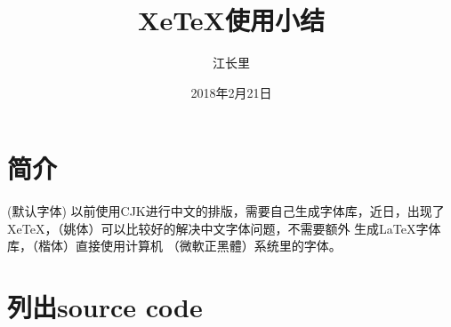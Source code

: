 \documentclass{article}
\begin{document}
\title{\hei XeTeX使用小结}
\author{\song 江长里}
\date{\kai 2018年2月21日}
\maketitle

\tableofcontents
\newpage


\makeatletter

\section{简介}
(默认字体) 以前使用CJK进行中文的排版，需要自己生成字体库，近日，出现了XeTeX，\yao （姚体）可以比较好的解决中文字体问题，不需要额外
生成LaTeX字体库，\kai （楷体）直接使用计算机 \henghei （微軟正黑體）系统里的字体。



\section{列出source code}
  

\end{document}
